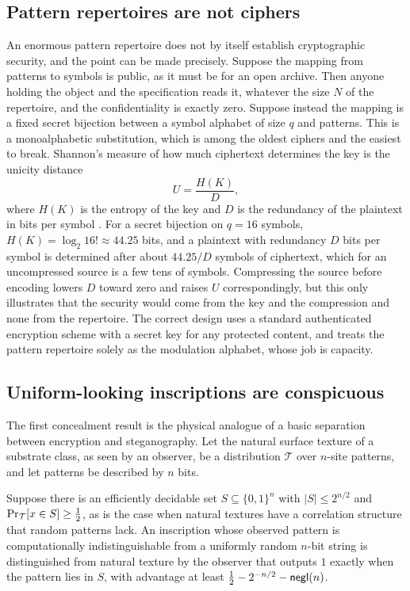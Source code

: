 \subsection{Pattern repertoires are not ciphers}

An enormous pattern repertoire does not by itself establish cryptographic security, and the point can be made precisely. Suppose the mapping from patterns to symbols is public, as it must be for an open archive. Then anyone holding the object and the specification reads it, whatever the size $N$ of the repertoire, and the confidentiality is exactly zero. Suppose instead the mapping is a fixed secret bijection between a symbol alphabet of size $q$ and patterns. This is a monoalphabetic substitution, which is among the oldest ciphers and the easiest to break. Shannon's measure of how much ciphertext determines the key is the unicity distance
\begin{equation}\label{eq:unicity}
U=\frac{H(K)}{D},
\end{equation}
where $H(K)$ is the entropy of the key and $D$ is the redundancy of the plaintext in bits per symbol \cite{shannon1949}. For a secret bijection on $q=16$ symbols, $H(K)=\log_2 16!\approx 44.25$ bits, and a plaintext with redundancy $D$ bits per symbol is determined after about $44.25/D$ symbols of ciphertext, which for an uncompressed source is a few tens of symbols. Compressing the source before encoding lowers $D$ toward zero and raises $U$ correspondingly, but this only illustrates that the security would come from the key and the compression and none from the repertoire. The correct design uses a standard authenticated encryption scheme with a secret key for any protected content, and treats the pattern repertoire solely as the modulation alphabet, whose job is capacity.

\subsection{Uniform-looking inscriptions are conspicuous}

The first concealment result is the physical analogue of a basic separation between encryption and steganography. Let the natural surface texture of a substrate class, as seen by an observer, be a distribution $\mathcal T$ over $n$-site patterns, and let patterns be described by $n$ bits.

\begin{proposition}\label{prop:conspicuous}
Suppose there is an efficiently decidable set $S\subseteq\{0,1\}^n$ with $|S|\le2^{n/2}$ and $\operatorname{Pr}_{\mathcal T}[x\in S]\ge\tfrac12$, as is the case when natural textures have a correlation structure that random patterns lack. An inscription whose observed pattern is computationally indistinguishable from a uniformly random $n$-bit string is distinguished from natural texture by the observer that outputs $1$ exactly when the pattern lies in $S$, with advantage at least $\tfrac12-2^{-n/2}-\mathsf{negl}(n)$.
\end{proposition}

